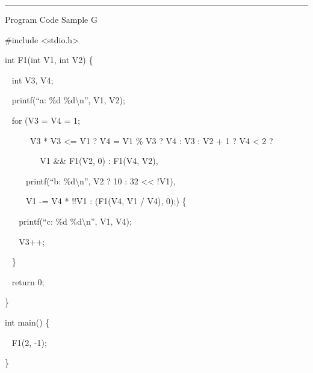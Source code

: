 \documentclass[]{article}
\begin{document}
{}

{}

\begin{center}\rule{0.5\linewidth}{\linethickness}\end{center}

{}

{Program Code Sample G}

{}

{\#include \textless{}stdio.h\textgreater{}}

{}

{int F1(int V1, int V2) \{}

{~ int V3, V4;}

{}

{~ printf(``a: \%d \%d\textbackslash{}n'', V1, V2);}

{}

{~ for (V3 = V4 = 1;}

{~ ~ ~ ~V3 * V3 \textless{}= V1 ? V4 = V1 \% V3 ? V4 : V3 : V2 + 1 ? V4
\textless{} 2 ?}

{~ ~ ~ ~ ~ V1 \&\& F1(V2, 0) : F1(V4, V2),}

{~ ~ ~ printf(``b: \%d\textbackslash{}n'', V2 ? 10 : 32
\textless{}\textless{} !V1),}

{~ ~ ~ V1 -= V4 * !!V1 : (F1(V4, V1 / V4), 0);) \{}

{~ ~ printf(``c: \%d \%d\textbackslash{}n'', V1, V4);}

{~ ~ V3++;}

{~ \}}

{}

{~ return 0;}

{\}}

{}

{int main() \{}

{~ F1(2, -1);}

{\}}

{}

\href{}{}\href{}{}
\end{document}
